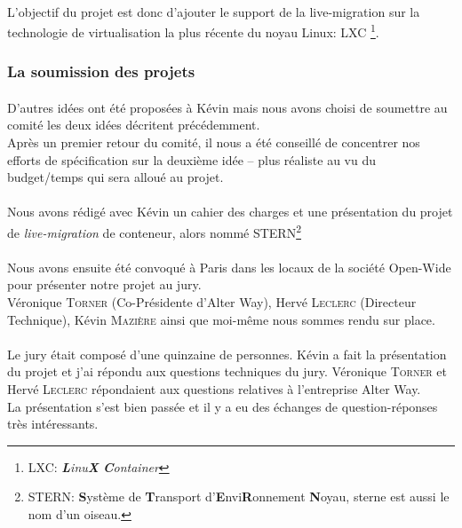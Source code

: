 \paragraph*{}
L'objectif du projet est donc d'ajouter le support de la live-migration sur la technologie de virtualisation la plus récente du noyau Linux: LXC
\footnote{LXC: \emph{\textbf{L}inu\textbf{X} \textbf{C}ontainer}}.


\subsubsection{La soumission des projets}
\paragraph*{}
D'autres idées ont été proposées à Kévin mais nous avons choisi de soumettre au comité les deux idées décritent précédemment.
\\
Après un premier retour du comité, il nous a été conseillé de concentrer nos efforts de spécification sur la deuxième idée -- plus réaliste au vu du budget/temps qui sera alloué au projet.

\paragraph*{}
Nous avons rédigé avec Kévin un cahier des charges et une présentation du projet de \emph{live-migration} de conteneur, alors nommé STERN\footnote{STERN:
\textbf{S}ystème de \textbf{T}ransport d'\textbf{E}nvi\textbf{R}onnement \textbf{N}oyau, sterne est aussi le nom d'un oiseau.}

\paragraph*{}
Nous avons ensuite été convoqué à Paris dans les locaux de la société Open-Wide pour présenter notre projet au jury.
\\
Véronique \textsc{Torner} (Co-Présidente d'Alter Way), Hervé \textsc{Leclerc} (Directeur Technique), Kévin \textsc{Mazière} ainsi que moi-même nous sommes rendu sur place.

\paragraph*{}
Le jury était composé d'une quinzaine de personnes. Kévin a fait la présentation du projet et j'ai répondu aux questions techniques du jury. Véronique \textsc{Torner}
et Hervé \textsc{Leclerc} répondaient aux questions relatives à l'entreprise Alter Way.
\\
La présentation s'est bien passée et il y a eu des échanges de question-réponses très intéressants.



